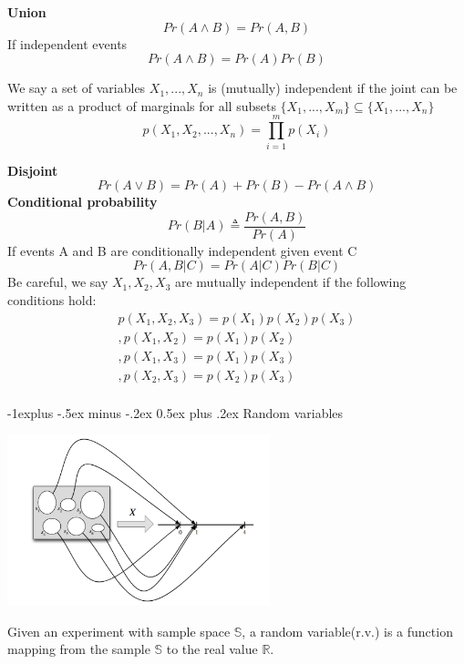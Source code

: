 \documentclass[10pt,landscape]{article}
\makeatletter
\renewcommand{\subsection}{\@startsection{subsection}{2}{0mm}%
                                {-1explus -.5ex minus -.2ex}%
                                {0.5ex plus .2ex}%
                                {\normalfont\normalsize\bfseries}}
\makeatother
\begin{document}
\begin{multicols*}{3}
    \textbf{Union}
    \[ Pr(A \land B)=Pr(A,B) \]
    If independent events
    \[ Pr(A \land B)=Pr(A)Pr(B) \] 

    We say a set of variables $X_1, . . . , X_n$ is (mutually) independent if the joint can be written as a product of marginals for all subsets $\{X_1,...,X_m\} \subseteq \{X_1,...,X_n\}$
    \begin{equation*}
        p(X_1,X_2,...,X_n)=\prod_{i=1}^{m}p(X_i)
    \end{equation*}
    
    \textbf{Disjoint}
    \[Pr(A \vee B)=Pr(A)+Pr(B)-Pr(A\land B)\]
    \textbf{Conditional probability}
    \[Pr(B|A)\triangleq \frac{Pr(A,B)}{Pr(A)}\]
    If events A and B are conditionally independent given event C
    \[Pr(A,B|C)=Pr(A|C)Pr(B|C)\]
    Be careful, we say $X_1,X_2,X_3$ are mutually independent if the following conditions hold:
    \begin{equation*}
        \begin{split}    
        p(X_1,X_2,X_3)=p(X_1)p(X_2)p(X_3)\\
        ,p(X_1,X_2)=p(X_1)p(X_2) \\
        ,p(X_1,X_3)=p(X_1)p(X_3) \\
        ,p(X_2,X_3)=p(X_2)p(X_3) \\
        \end{split}
    \end{equation*}
    
\subsection{Random variables}
    \begin{minipage}{\linewidth}
            \centering
            \includegraphics[width=3in]{figures/rv.PNG}
    \end{minipage}
    Given an experiment with sample space $\mathbb{S}$, a random variable(r.v.) is a function mapping from the sample $\mathbb{S}$ to the real value $\mathbb{R}$.
    

\end{multicols*}
\end{document}
